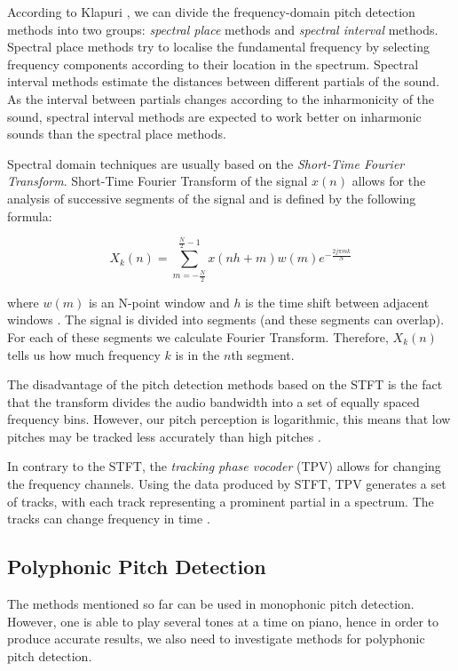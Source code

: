 \documentclass[11pt]{article} %
\begin{document}
According to Klapuri \citeyearpar{Klapuri2006}, we can divide the frequency-domain pitch detection methods into two groups: \textit{spectral place} methods and \textit{spectral interval} methods. Spectral place methods try to localise the fundamental frequency by selecting frequency components according to their location in the spectrum. Spectral interval methods estimate the distances between different partials of the sound. As the interval between partials changes according to the inharmonicity of the sound, spectral interval methods are expected to work better on inharmonic sounds than the spectral place methods.

Spectral domain techniques are usually based on the \textit{Short-Time Fourier Transform}. Short-Time Fourier Transform of the signal $x(n)$ allows for the analysis of successive segments of the signal and is defined by the following formula:

\[X_k(n) = \sum\limits_{m=-\frac{N}{2}}^{\frac{N}{2}-1} x(nh+m)w(m)e^{-\frac{2j\pi mk}{N}} \]

where $w(m)$ is an N-point window and $h$ is the time shift between adjacent windows \citep*{Bello2005}.
The signal is divided into segments (and these segments can overlap). For each of these segments we calculate Fourier Transform. Therefore, $X_k(n)$ tells us how much frequency $k$ is in the $n$th segment.

The disadvantage of the pitch detection methods based on the STFT is the fact that the transform divides the audio bandwidth into a set of equally spaced frequency bins. However, our pitch perception is logarithmic, this means that low pitches may be tracked less accurately than high pitches \citep*{Roads1996}. 


In contrary to the STFT, the \textit{tracking phase vocoder} (TPV) allows for changing the frequency channels. Using the data produced by STFT, TPV generates a set of tracks, with each track representing a prominent partial in a spectrum. The tracks can change frequency in time \citep*{Roads1996}. 

\subsection{Polyphonic Pitch Detection}
The methods mentioned so far can be used in monophonic pitch detection. However, one is able to play several tones at a time on piano, hence in order to produce accurate results, we also need to investigate methods for polyphonic pitch detection.
\end{document}
